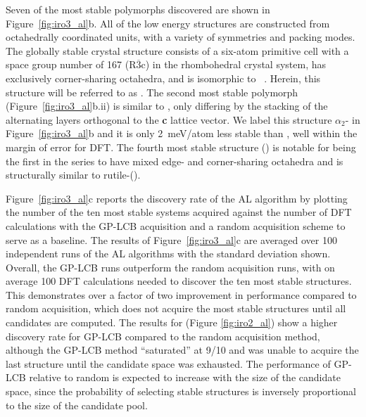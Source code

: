 %
Seven of the most stable \IrOthree polymorphs discovered are shown in Figure~\ref{fig:iro3_al}b.
%
All of the low energy \IrOthree structures are constructed from octahedrally coordinated units, with a variety of symmetries and packing modes.
%
The globally stable crystal structure consists of a six-atom primitive cell with a space group number of \num{167} (R$\overline{3}$c) in the rhombohedral crystal system, has exclusively corner-sharing octahedra, and is isomorphic to ~\cite{Hepworth1957}.
%
Herein, this structure will be referred to as \aIrOthree.
%
The second most stable polymorph (Figure~\ref{fig:iro3_al}b.ii) is similar to \aIrOthree,
only differing by the stacking of the alternating layers orthogonal to the \textbf{c} lattice vector.
%
We label this structure $\alpha_{2}$- in Figure~\ref{fig:iro3_al}b and it is only \SI{2}{\milli\electronvolt}/atom less stable than \aIrOthree,
well within the margin of error for DFT.
%
The fourth most stable structure (\rIrOthree) is notable for being the first in the series to have mixed edge- and corner-sharing octahedra and is structurally similar to rutile-\IrOtwo (\rIrOtwo).


%
%
Figure~\ref{fig:iro3_al}c reports the discovery rate of the AL algorithm by plotting
the number of the ten most stable systems acquired against the number of DFT calculations with the GP-LCB acquisition and a random acquisition scheme to serve as a baseline.
%
The results of Figure~\ref{fig:iro3_al}c are averaged over \num{100} independent runs of the AL algorithms with the standard deviation shown.
%
Overall, the GP-LCB runs outperform the random acquisition runs, with on average \mytilde\num{100} DFT calculations needed to discover the ten most stable structures.
%
This demonstrates over a factor of two improvement in performance compared to random acquisition,
which does not acquire the most stable structures until all  candidates are computed.
%
The results for \IrOtwo (Figure \ref{fig:iro2_al}) show a higher discovery rate for GP-LCB compared to the random acquisition method,
although the GP-LCB method ``saturated'' at \num{9/10} and was unable to acquire the last structure until the candidate space was exhausted.
%
The performance of GP-LCB relative to random is expected to increase with the size of the candidate space, since the probability of selecting stable structures is inversely proportional to the size of the candidate pool.


